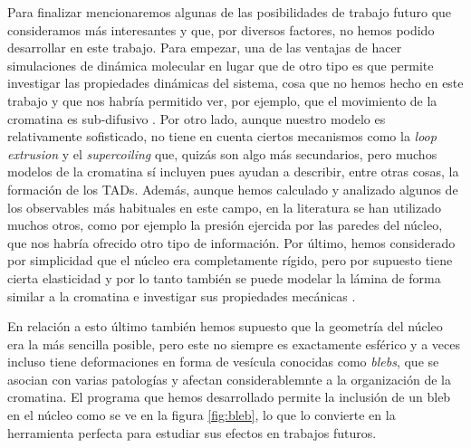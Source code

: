Para finalizar mencionaremos algunas de las posibilidades de trabajo futuro que consideramos más interesantes y que, por diversos factores, no hemos podido desarrollar en este trabajo. Para empezar, una de las ventajas de hacer simulaciones de dinámica molecular en lugar que de otro tipo es que permite investigar las propiedades dinámicas del sistema, cosa que no hemos hecho en este trabajo y que nos habría permitido ver, por ejemplo, que el movimiento de la cromatina es sub-difusivo \cite{Shi2018}. Por otro lado, aunque nuestro modelo es relativamente sofisticado, no tiene en cuenta ciertos mecanismos como la \textit{loop extrusion} y el \textit{supercoiling} que, quizás son algo más secundarios, pero muchos modelos de la cromatina sí incluyen pues ayudan a describir, entre otras cosas, la formación de los TADs. Además, aunque hemos calculado y analizado algunos de los observables más habituales en este campo, en la literatura se han utilizado muchos otros, como por ejemplo la presión ejercida por las paredes del núcleo, que nos habría ofrecido otro tipo de información. Por último, hemos considerado por simplicidad que el núcleo era completamente rígido, pero por supuesto tiene cierta elasticidad y por lo tanto también se puede modelar la lámina de forma similar a la cromatina e investigar sus propiedades mecánicas \cite{Attar2024}.

En relación a esto último también hemos supuesto que la geometría del núcleo era la más sencilla posible, pero este no siempre es exactamente esférico y a veces incluso tiene deformaciones en forma de vesícula conocidas como \textit{blebs}, que se asocian con varias patologías y afectan considerablemnte a la organización de la cromatina. El programa que hemos desarrollado permite la inclusión de un bleb en el núcleo como se ve en la figura \ref{fig:bleb}, lo que lo convierte en la herramienta perfecta para estudiar sus efectos en trabajos futuros.
